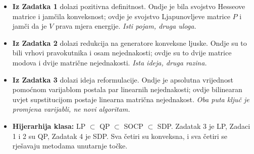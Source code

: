 \begin{predznanje}
\begin{itemize}[leftmargin=*]
  \item \textbf{Iz Zadatka 1} dolazi pozitivna definitnost. Ondje je bila
        svojstvo Hesseove matrice i jamčila konveksnost; ovdje je svojstvo
        Ljapunovljeve matrice $P$ i jamči da je $V$ prava mjera energije.
        \emph{Isti pojam, druga uloga.}
  \item \textbf{Iz Zadatka 2} dolazi redukcija na generatore konveksne ljuske.
        Ondje su to bili vrhovi pravokutnika i osam nejednakosti; ovdje su to
        dvije matrice modova i dvije matrične nejednakosti. \emph{Ista ideja, druga
        razina.}
  \item \textbf{Iz Zadatka 3} dolazi ideja reformulacije. Ondje je apsolutna
        vrijednost pomoćnom varijablom postala par linearnih nejednakosti; ovdje
        bilinearan uvjet supstitucijom postaje linearna matrična nejednakost.
        \emph{Oba puta ključ je promjena varijabli, ne novi algoritam.}
  \item \textbf{Hijerarhija klasa:} LP $\subset$ QP $\subset$ SOCP $\subset$ SDP.
        Zadatak 3 je LP, Zadaci 1 i 2 su QP, Zadatak 4 je SDP. Sva četiri su
        konveksna, i sva četiri se rješavaju metodama unutarnje točke.
\end{itemize}
\end{predznanje}

